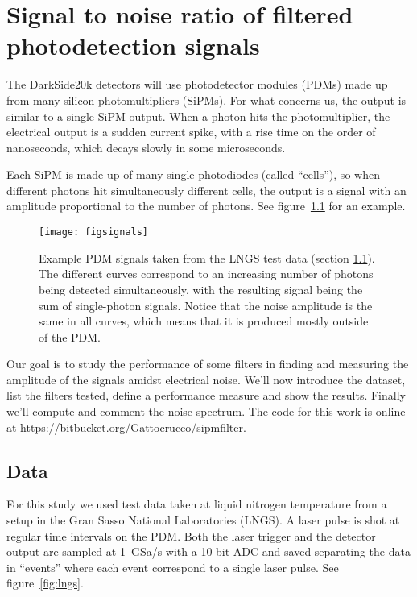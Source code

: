 \chapter{Signal to noise ratio of filtered photodetection signals}

The DarkSide20k detectors will use photodetector modules (PDMs) made up from
many silicon photomultipliers (SiPMs). For what concerns us, the output is
similar to a single SiPM output. When a photon hits the photomultiplier, the
electrical output is a sudden current spike, with a rise time on the order of
nanoseconds, which decays slowly in some microseconds.

Each SiPM is made up of many single photodiodes (called ``cells''), so when
different photons hit simultaneously different cells, the output is a signal
with an amplitude proportional to the number of photons. See
figure~\ref{fig:signals} for an example.


\begin{figure}
    \texttt{[image: figsignals]}

    \caption{Example PDM signals taken from the LNGS test data (section
    \ref{sec:lngsdata}). The different curves correspond to an increasing
    number of photons being detected simultaneously, with the resulting signal
    being the sum of single-photon signals. Notice that the noise amplitude is
    the same in all curves, which means that it is produced mostly outside of
    the PDM.}

    \label{fig:signals}
\end{figure}

Our goal is to study the performance of some filters in finding and measuring
the amplitude of the signals amidst electrical noise. We'll now introduce the
dataset, list the filters tested, define a performance measure and show the
results. Finally we'll compute and comment the noise spectrum. The code for
this work is online at \url{https://bitbucket.org/Gattocrucco/sipmfilter}.

\section{Data}
\label{sec:lngsdata}

For this study we used test data taken at liquid nitrogen temperature from a
setup in the Gran Sasso National Laboratories (LNGS). A laser pulse is shot at
regular time intervals on the PDM. Both the laser trigger and the detector
output are sampled at \SI{1}{GSa/s} with a 10 bit ADC and saved separating the
data in ``events'' where each event correspond to a single laser pulse. See
figure~\ref{fig:lngs}.

